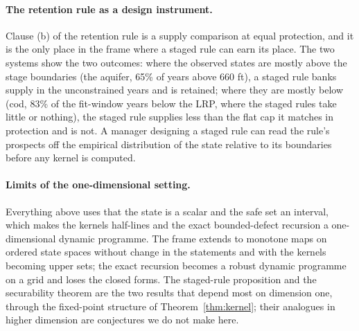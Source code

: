\paragraph{The retention rule as a design instrument.}
Clause (b) of the retention rule is a supply comparison at equal protection, and it is the only place in the frame where a staged rule can earn its place. The two systems show the two outcomes: where the observed states are mostly above the stage boundaries (the aquifer, 65\% of years above 660 ft), a staged rule banks supply in the unconstrained years and is retained; where they are mostly below (cod, 83\% of the fit-window years below the LRP, where the staged rules take little or nothing), the staged rule supplies less than the flat cap it matches in protection and is not. A manager designing a staged rule can read the rule's prospects off the empirical distribution of the state relative to its boundaries before any kernel is computed.

\paragraph{Limits of the one-dimensional setting.}
Everything above uses that the state is a scalar and the safe set an interval, which makes the kernels half-lines and the exact bounded-defect recursion a one-dimensional dynamic programme. The frame extends to monotone maps on ordered state spaces without change in the statements and with the kernels becoming upper sets; the exact recursion becomes a robust dynamic programme on a grid and loses the closed forms. The staged-rule proposition and the securability theorem are the two results that depend most on dimension one, through the fixed-point structure of Theorem~\ref{thm:kernel}; their analogues in higher dimension are conjectures we do not make here.
